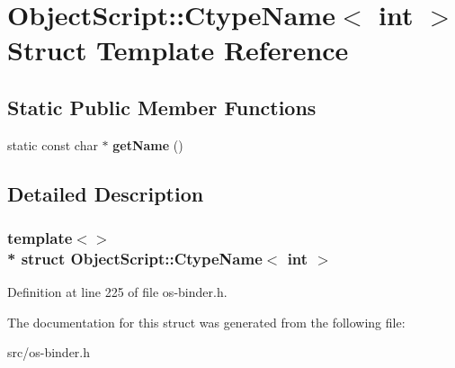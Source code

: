 \hypertarget{struct_object_script_1_1_ctype_name_3_01int_01_4}{}\section{Object\+Script\+:\+:Ctype\+Name$<$ int $>$ Struct Template Reference}
\label{struct_object_script_1_1_ctype_name_3_01int_01_4}
\subsection*{Static Public Member Functions}
\begin{DoxyCompactItemize}
\item 
static const char $\ast$ {\bfseries get\+Name} ()\hypertarget{struct_object_script_1_1_ctype_name_3_01int_01_4_a0b01b588dd9de27d18b93f5b17ab43c8}{}\label{struct_object_script_1_1_ctype_name_3_01int_01_4_a0b01b588dd9de27d18b93f5b17ab43c8}

\end{DoxyCompactItemize}


\subsection{Detailed Description}
\subsubsection*{template$<$$>$\\*
struct Object\+Script\+::\+Ctype\+Name$<$ int $>$}



Definition at line 225 of file os-\/binder.\+h.



The documentation for this struct was generated from the following file\+:\begin{DoxyCompactItemize}
\item 
src/os-\/binder.\+h\end{DoxyCompactItemize}

